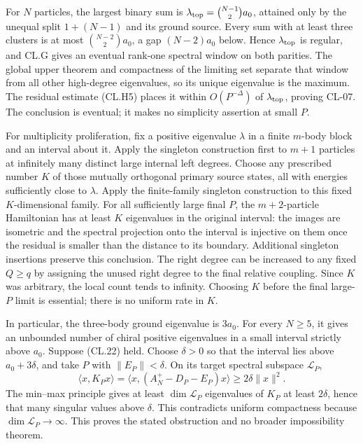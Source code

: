 For \(N\) particles, the largest binary sum is \(\lambda_{\rm top}=\binom{N-1}{2}a_0\), attained only by the unequal split \(1+(N-1)\) and its ground source. Every sum with at least three clusters is at most \(\binom{N-2}{2}a_0\), a gap \((N-2)a_0\) below. Hence \(\lambda_{\rm top}\) is regular, and CL.G gives an eventual rank-one spectral window on both parities. The global upper theorem and compactness of the limiting set separate that window from all other high-degree eigenvalues, so its unique eigenvalue is the maximum. The residual estimate (CL.H5) places it within \(O(P^{-\Delta})\) of \(\lambda_{\rm top}\), proving CL-07. The conclusion is eventual; it makes no simplicity assertion at small \(P\).

For multiplicity proliferation, fix a positive eigenvalue \(\lambda\) in a finite \(m\)-body block and an interval about it. Apply the singleton construction first to \(m+1\) particles at infinitely many distinct large internal left degrees. Choose any prescribed number \(K\) of those mutually orthogonal primary source states, all with energies sufficiently close to \(\lambda\). Apply the finite-family singleton construction to this fixed \(K\)-dimensional family. For all sufficiently large final \(P\), the \(m+2\)-particle Hamiltonian has at least \(K\) eigenvalues in the original interval: the images are isometric and the spectral projection onto the interval is injective on them once the residual is smaller than the distance to its boundary. Additional singleton insertions preserve this conclusion. The right degree can be increased to any fixed \(Q\geq q\) by assigning the unused right degree to the final relative coupling. Since \(K\) was arbitrary, the local count tends to infinity. Choosing \(K\) before the final large-\(P\) limit is essential; there is no uniform rate in \(K\).

In particular, the three-body ground eigenvalue is \(3a_0\). For every \(N\geq5\), it gives an unbounded number of chiral positive eigenvalues in a small interval strictly above \(a_0\). Suppose (CL.22) held. Choose \(\delta>0\) so that the interval lies above \(a_0+3\delta\), and take \(P\) with \(\|E_P\|<\delta\). On its target spectral subspace \(\mathcal L_P\), \[
\langle x,K_Px\rangle
=\langle x,(A_N^+-D_P-E_P)x\rangle
\geq2\delta\|x\|^2.
\] The min--max principle gives at least \(\dim\mathcal L_P\) eigenvalues of \(K_P\) at least \(2\delta\), hence that many singular values above \(\delta\). This contradicts uniform compactness because \(\dim\mathcal L_P\to\infty\). This proves the stated obstruction and no broader impossibility theorem.

